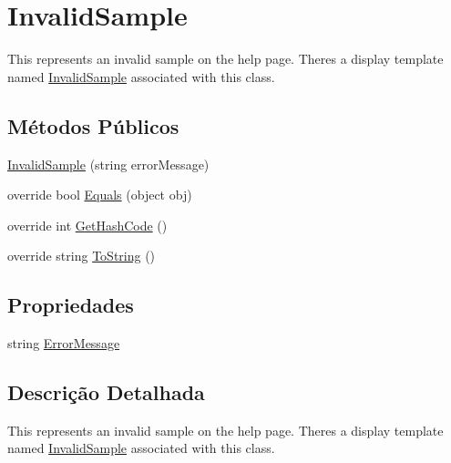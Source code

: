 \hypertarget{classApi3Layers_1_1Areas_1_1HelpPage_1_1InvalidSample}{}\section{Invalid\+Sample}
\label{classApi3Layers_1_1Areas_1_1HelpPage_1_1InvalidSample}


This represents an invalid sample on the help page. There\textquotesingle{}s a display template named \hyperlink{classApi3Layers_1_1Areas_1_1HelpPage_1_1InvalidSample}{Invalid\+Sample} associated with this class.  


\subsection*{Métodos Públicos}
\begin{DoxyCompactItemize}
\item 
\hyperlink{classApi3Layers_1_1Areas_1_1HelpPage_1_1InvalidSample_a272c2cb3c8fcf18555113e8a8c3e6789}{Invalid\+Sample} (string error\+Message)
\item 
override bool \hyperlink{classApi3Layers_1_1Areas_1_1HelpPage_1_1InvalidSample_aadf763f0213fc2f3875230b06bb0b6cf}{Equals} (object obj)
\item 
override int \hyperlink{classApi3Layers_1_1Areas_1_1HelpPage_1_1InvalidSample_a77e1afa2b6dee1ed3640da81d7407b42}{Get\+Hash\+Code} ()
\item 
override string \hyperlink{classApi3Layers_1_1Areas_1_1HelpPage_1_1InvalidSample_aa73e7c4dd1df5fd5fbf81c7764ee1533}{To\+String} ()
\end{DoxyCompactItemize}
\subsection*{Propriedades}
\begin{DoxyCompactItemize}
\item 
string \hyperlink{classApi3Layers_1_1Areas_1_1HelpPage_1_1InvalidSample_a4a0b9b632a14e17b26850b7c5ddb6096}{Error\+Message}
\end{DoxyCompactItemize}


\subsection{Descrição Detalhada}
This represents an invalid sample on the help page. There\textquotesingle{}s a display template named \hyperlink{classApi3Layers_1_1Areas_1_1HelpPage_1_1InvalidSample}{Invalid\+Sample} associated with this class. 



